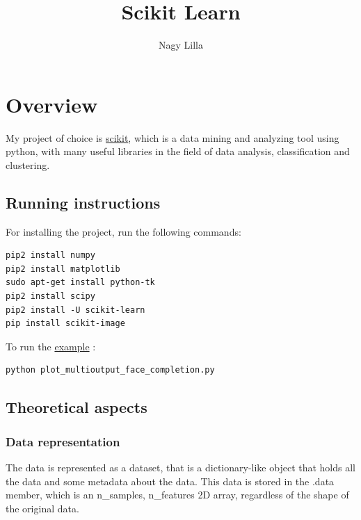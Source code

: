 \documentclass[a4paper,10pt]{article}
\title{Scikit Learn}
\author{Nagy Lilla}
\newcommand\tab[1][0.5cm]{\hspace*{#1}}
\begin{document}
\maketitle


\tableofcontents
\section{Overview}

\tab My project of choice is \href{http://scikit-learn.org/stable/auto_examples/plot_multioutput_face_completion.html#sphx-glr-auto-examples-plot-multioutput-face-completion-py}{scikit}, which is a data mining and analyzing tool using python, with many useful libraries in the field of data analysis, classification and clustering.

 \subsection{Running instructions}
\tab For installing the project, run the following commands:
\begin{lstlisting}
pip2 install numpy
pip2 install matplotlib
sudo apt-get install python-tk
pip2 install scipy
pip2 install -U scikit-learn
pip install scikit-image
\end{lstlisting}
\tab To run the \href{http://scikit-learn.org/stable/auto_examples/plot_multioutput_face_completion.html#sphx-glr-auto-examples-plot-multioutput-face-completion-py}{example} :
\begin{lstlisting}
python plot_multioutput_face_completion.py
\end{lstlisting}
 
 
 \subsection{Theoretical aspects}
  \subsubsection{Data representation}
  \tab The data is represented as a dataset, that is a dictionary-like object that holds all the data and some metadata about the data. This data is stored in the {\selectfont .data} member, which is an {\selectfont n\_samples}, {\selectfont n\_features} 2D array, regardless of the shape of the original data.
\end{document}
